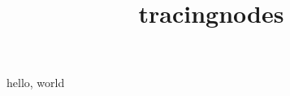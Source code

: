 \documentclass{amsart}
\title{tracingnodes}
\begin{document}
\maketitle

hello, \hbox{world}
\end{document}
